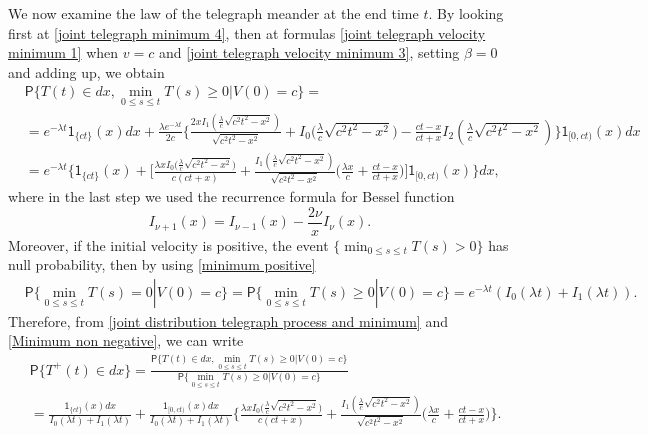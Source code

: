 \documentclass{article}
\theoremstyle{definition}
\numberwithin{equation}{section}
\begin{document}
We now examine the law of the telegraph meander at the end time $t$. By looking first at \eqref{joint telegraph minimum 4}, then at formulas \eqref{joint telegraph velocity minimum 1} when $v=c$ and  \eqref{joint telegraph velocity minimum 3}, setting $\beta = 0$ and adding up, we obtain
\begin{align}\label{joint distribution telegraph process and minimum}
&\mathsf{P}\{T(t) \in dx,\min_{0\leq s\leq t}T(s) \geq 0|V(0) = c\} = \nonumber\\
&=e^{-\lambda t}\mathsf{1}_{\{ct\}}(x)dx+\frac{\lambda e^{-\lambda t}}{2c}\bigg\{\frac{2xI_1(\frac{\lambda}{c}\sqrt{c^2t^2-x^2})}{\sqrt{c^2t^2-x^2}}+I_0\big(\frac{\lambda}{c}\sqrt{c^2t^2-x^2}\big)-\frac{ct-x}{ct+x}I_2(\frac{\lambda}{c}\sqrt{c^2t^2-x^2})\bigg\}\mathsf{1}_{[0,ct)}(x)dx\nonumber\\
&=e^{-\lambda t}\bigg\{\mathsf{1}_{\{ct\}}(x)+\bigg[\frac{\lambda xI_0\big(\frac{\lambda}{c}\sqrt{c^2t^2-x^2}\big)}{c(ct+x)}+\frac{I_1(\frac{\lambda}{c}\sqrt{c^2t^2-x^2})}{\sqrt{c^2t^2-x^2}}\Big(\frac{\lambda x}{c}+\frac{ct-x}{ct+x}\Big)\bigg]\mathsf{1}_{[0,ct)}(x)\bigg\}dx,
\end{align}
where in the last step we used the recurrence formula for Bessel function
\begin{equation}\label{properties Bessel}
I_{\nu+1}(x) = I_{\nu-1}(x)-\frac{2\nu}{x}I_\nu(x).
\end{equation}
Moreover, if the initial velocity is positive, the event $\{\min_{0\leq s\leq t}T(s)>0\}$ has null probability, then by using \eqref{minimum positive}
\begin{align}\label{Minimum non negative}
&\mathsf{P}\{\min_{0\leq s \leq t}T(s) = 0 |V(0) = c\} = \mathsf{P}\{\min_{0\leq s \leq t}T(s) \geq 0 |V(0) = c\} = e^{-\lambda t}(I_0(\lambda t)+I_1(\lambda t)).
\end{align}
Therefore, from \eqref{joint distribution telegraph process and minimum} and \eqref{Minimum non negative}, we can write
\begin{align}\label{Telegraph meander t 3}
&\mathsf{P}\{T^+(t) \in dx\} = \frac{\mathsf{P}\{T(t) \in dx,\min_{0\leq s\leq t}T(s) \geq 0|V(0) = c\}}{\mathsf{P}\{\min_{0\leq s\leq t}T(s) \geq 0|V(0) = c\}}\nonumber\\
&=\frac{\mathsf{1}_{\{ct\}}(x)dx}{I_0(\lambda t)+I_1(\lambda t)}+\frac{\mathsf{1}_{[0,ct)}(x)dx}{I_0(\lambda t)+I_1(\lambda t)}\bigg\{\frac{\lambda xI_0\big(\frac{\lambda}{c}\sqrt{c^2t^2-x^2}\big)}{c(ct+x)}+\frac{I_1(\frac{\lambda}{c}\sqrt{c^2t^2-x^2})}{\sqrt{c^2t^2-x^2}}\Big(\frac{\lambda x}{c}+\frac{ct-x}{ct+x}\Big)\bigg\}.
\end{align}
\end{document}
